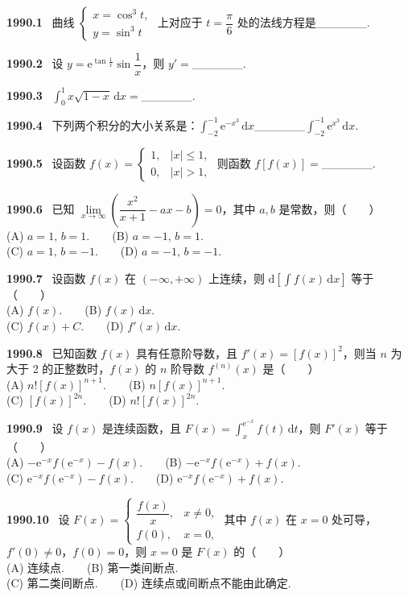 \documentclass[UTF8,12pt]{ctexart}
\newcommand{\qn}[1]{\textbf{\large #1}\ }
\begin{document}
\qn{1990.1}
曲线 $\begin{cases} x=\cos^3 t, \\ y=\sin^3 t \end{cases}$ 上对应于 $t=\dfrac{\pi}{6}$ 处的法线方程是______.

\vfill
\newpage
\qn{1990.2}
设 $y=\mathrm{e}^{\tan\frac{1}{x}}\sin\dfrac{1}{x}$，则 $y'=$______.

\vfill
\newpage
\qn{1990.3}
$\int_0^1 x\sqrt{1-x}\,\mathrm{d}x=$______.

\vfill
\newpage
\qn{1990.4}
下列两个积分的大小关系是：$\int_{-2}^{-1}\mathrm{e}^{-x^3}\,\mathrm{d}x$______$\int_{-2}^{-1}\mathrm{e}^{x^3}\,\mathrm{d}x$.

\vfill
\newpage
\qn{1990.5}
设函数 $f(x)=\begin{cases} 1, & |x|\leqslant 1, \\ 0, & |x|>1, \end{cases}$ 则函数 $f[f(x)]=$______.

\vfill
\newpage
\qn{1990.6}
已知 $\lim\limits_{x\to\infty}\left(\dfrac{x^2}{x+1}-ax-b\right)=0$，其中 $a,b$ 是常数，则（　　）
\\
\noindent (A) $a=1,\,b=1$.　　(B) $a=-1,\,b=1$.
\\
\noindent (C) $a=1,\,b=-1$.　　(D) $a=-1,\,b=-1$.

\vfill
\newpage
\qn{1990.7}
设函数 $f(x)$ 在 $(-\infty,+\infty)$ 上连续，则 $\mathrm{d}\left[\int f(x)\,\mathrm{d}x\right]$ 等于（　　）
\\
\noindent (A) $f(x)$.　　(B) $f(x)\,\mathrm{d}x$.
\\
\noindent (C) $f(x)+C$.　　(D) $f'(x)\,\mathrm{d}x$.

\vfill
\newpage
\qn{1990.8}
已知函数 $f(x)$ 具有任意阶导数，且 $f'(x)=[f(x)]^2$，则当 $n$ 为大于 2 的正整数时，$f(x)$ 的 $n$ 阶导数 $f^{(n)}(x)$ 是（　　）
\\
\noindent (A) $n![f(x)]^{n+1}$.　　(B) $n[f(x)]^{n+1}$.
\\
\noindent (C) $[f(x)]^{2n}$.　　(D) $n![f(x)]^{2n}$.

\vfill
\newpage
\qn{1990.9}
设 $f(x)$ 是连续函数，且 $F(x)=\int_x^{\mathrm{e}^{-x}}f(t)\,\mathrm{d}t$，则 $F'(x)$ 等于（　　）
\\
\noindent (A) $-\mathrm{e}^{-x}f(\mathrm{e}^{-x})-f(x)$.　　(B) $-\mathrm{e}^{-x}f(\mathrm{e}^{-x})+f(x)$.
\\
\noindent (C) $\mathrm{e}^{-x}f(\mathrm{e}^{-x})-f(x)$.　　(D) $\mathrm{e}^{-x}f(\mathrm{e}^{-x})+f(x)$.

\vfill
\newpage
\qn{1990.10}
设 $F(x)=\begin{cases} \dfrac{f(x)}{x}, & x\neq 0, \\ f(0), & x=0, \end{cases}$ 其中 $f(x)$ 在 $x=0$ 处可导，$f'(0)\neq 0$，$f(0)=0$，则 $x=0$ 是 $F(x)$ 的（　　）
\\
\noindent (A) 连续点.　　(B) 第一类间断点.
\\
\noindent (C) 第二类间断点.　　(D) 连续点或间断点不能由此确定.
\end{document}
